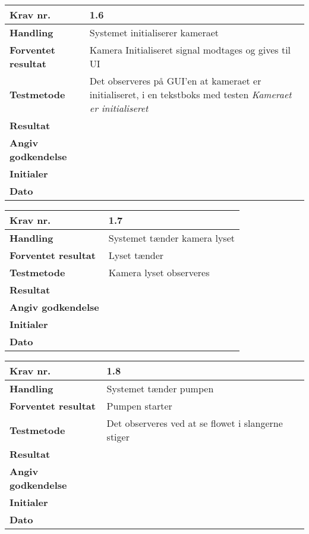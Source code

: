 	\begin{center}
		\begin{longtable}{ | m{4cm}| m{8.5cm}|} 
			\hline
			\textbf{Krav nr.} & 1.6    \\ 
			\hline
			\textbf{Handling} &  Systemet initialiserer kameraet  \\
			\hline
			\textbf{Forventet resultat} &  Kamera Initialiseret signal modtages og gives til UI  \\
			\hline
			\textbf{Testmetode}  & Det observeres på GUI’en at kameraet er initialiseret, i en tekstboks med testen \textit{Kameraet er initialiseret}   \\
			\hline
			\textbf{Resultat}  &    \\
			\hline
			\textbf{Angiv godkendelse} &     \\
			\hline
			\textbf{Initialer} &     \\
			\hline
			\textbf{Dato} &    \\
			\hline
		\end{longtable}
	\end{center}

\newpage

	\begin{center}
		\begin{longtable}{ | m{4cm}| m{8.5cm}|} 
			\hline
			\textbf{Krav nr.} & 1.7    \\ 
			\hline
			\textbf{Handling} &  Systemet tænder kamera lyset \\
			\hline
			\textbf{Forventet resultat} &  Lyset tænder  \\
			\hline
			\textbf{Testmetode}  & Kamera lyset observeres   \\
			\hline
			\textbf{Resultat}  &    \\
			\hline
			\textbf{Angiv godkendelse} &     \\
			\hline
			\textbf{Initialer} &     \\
			\hline
			\textbf{Dato} &    \\
			\hline
		\end{longtable}
	\end{center}

	\begin{center}
		\begin{longtable}{ | m{4cm}| m{8.5cm}|} 
			\hline
			\textbf{Krav nr.} & 1.8    \\ 
			\hline
			\textbf{Handling} &  Systemet tænder pumpen \\
			\hline
			\textbf{Forventet resultat} &  Pumpen starter \\
			\hline
			\textbf{Testmetode}  & Det observeres ved at se flowet i slangerne stiger  \\
			\hline
			\textbf{Resultat}  &    \\
			\hline
			\textbf{Angiv godkendelse} &     \\
			\hline
			\textbf{Initialer} &     \\
			\hline
			\textbf{Dato} &    \\
			\hline
		\end{longtable}
	\end{center}
	
